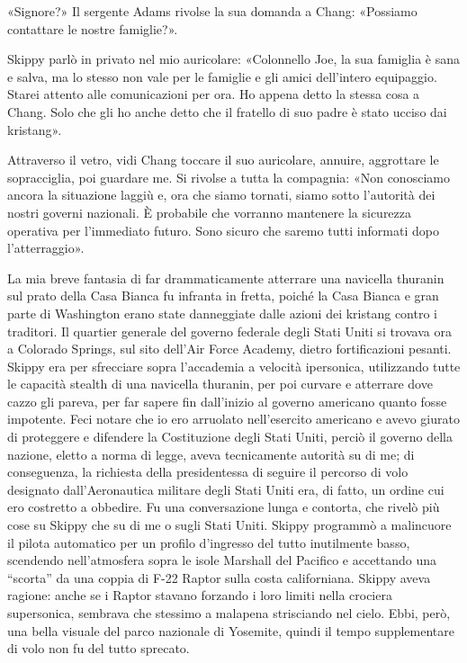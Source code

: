 «Signore?» Il sergente Adams rivolse la sua domanda a Chang: «Possiamo
contattare le nostre famiglie?».

Skippy parlò in privato nel mio auricolare: «Colonnello Joe, la sua
famiglia è sana e salva, ma lo stesso non vale per le famiglie e gli
amici dell'intero equipaggio. Starei attento alle comunicazioni per ora.
Ho appena detto la stessa cosa a Chang. Solo che gli ho anche detto che
il fratello di suo padre è stato ucciso dai kristang».

Attraverso il vetro, vidi Chang toccare il suo auricolare, annuire,
aggrottare le sopracciglia, poi guardare me. Si rivolse a tutta la
compagnia: «Non conosciamo ancora la situazione laggiù e, ora che siamo
tornati, siamo sotto l'autorità dei nostri governi nazionali. È
probabile che vorranno mantenere la sicurezza operativa per l'immediato
futuro. Sono sicuro che saremo tutti informati dopo l'atterraggio».

\hfill\break

La mia breve fantasia di far drammaticamente atterrare una navicella
thuranin sul prato della Casa Bianca fu infranta in fretta, poiché la
Casa Bianca e gran parte di Washington erano state danneggiate dalle
azioni dei kristang contro i traditori. Il quartier generale del governo
federale degli Stati Uniti si trovava ora a Colorado Springs, sul sito
dell'Air Force Academy, dietro fortificazioni pesanti. Skippy era per
sfrecciare sopra l'accademia a velocità ipersonica, utilizzando tutte le
capacità stealth di una navicella thuranin, per poi curvare e atterrare
dove cazzo gli pareva, per far sapere fin dall'inizio al governo
americano quanto fosse impotente. Feci notare che io ero arruolato
nell'esercito americano e avevo giurato di proteggere e difendere la
Costituzione degli Stati Uniti, perciò il governo della nazione, eletto
a norma di legge, aveva tecnicamente autorità su di me; di conseguenza,
la richiesta della presidentessa di seguire il percorso di volo
designato dall'Aeronautica militare degli Stati Uniti era, di fatto, un
ordine cui ero costretto a obbedire. Fu una conversazione lunga e
contorta, che rivelò più cose su Skippy che su di me o sugli Stati
Uniti. Skippy programmò a malincuore il pilota automatico per un profilo
d'ingresso del tutto inutilmente basso, scendendo nell'atmosfera sopra
le isole Marshall del Pacifico e accettando una ``scorta'' da una coppia
di F-22 Raptor sulla costa californiana. Skippy aveva ragione: anche se
i Raptor stavano forzando i loro limiti nella crociera supersonica,
sembrava che stessimo a malapena strisciando nel cielo. Ebbi, però, una
bella visuale del parco nazionale di Yosemite, quindi il tempo
supplementare di volo non fu del tutto sprecato.

